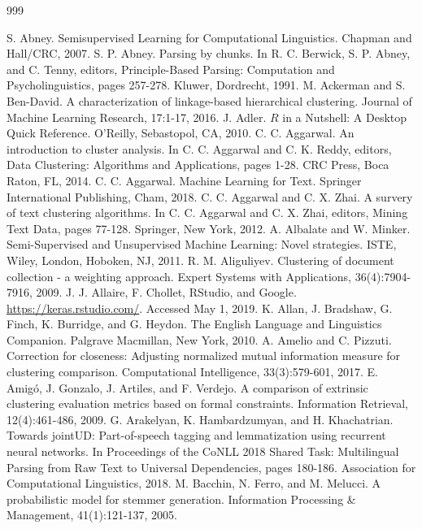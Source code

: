 \documentclass[11pt,openany,executivepaper]{book}
\begin{document}
\backmatter
{}
\begingroup\sloppy
\begin{thebibliography}{999}\RaggedRight

 S. Abney. Semisupervised Learning for Computational Linguistics. Chapman and Hall/CRC, 2007.
 S. P. Abney. Parsing by chunks. In R. C. Berwick, S. P. Abney, and C. Tenny, editors, Principle-Based Parsing: Computation and Psycholinguistics, pages 257-278. Kluwer, Dordrecht, 1991.
 M. Ackerman and S. Ben-David. A characterization of linkage-based hierarchical clustering. Journal of Machine Learning Research, 17:1-17, 2016.
 J. Adler. $R$ in a Nutshell: A Desktop Quick Reference. O'Reilly, Sebastopol, CA, 2010.
 C. C. Aggarwal. An introduction to cluster analysis. In C. C. Aggarwal and C. K. Reddy, editors, Data Clustering: Algorithms and Applications, pages 1-28. CRC Press, Boca Raton, FL, 2014.
 C. C. Aggarwal. Machine Learning for Text. Springer International Publishing, Cham, 2018.
 C. C. Aggarwal and C. X. Zhai. A survery of text clustering algorithms. In C. C. Aggarwal and C. X. Zhai, editors, Mining Text Data, pages 77-128. Springer, New York, 2012.
 A. Albalate and W. Minker. Semi-Supervised and Unsupervised Machine Learning: Novel strategies. ISTE, Wiley, London, Hoboken, NJ, 2011.
 R. M. Aliguliyev. Clustering of document collection - a weighting approach. Expert Systems with Applications, 36(4):7904-7916, 2009.
 J. J. Allaire, F. Chollet, RStudio, and Google. \url{https://keras.rstudio.com/}. Accessed May 1, 2019.
 K. Allan, J. Bradshaw, G. Finch, K. Burridge, and G. Heydon. The English Language and Linguistics Companion. Palgrave Macmillan, New York, 2010.
 A. Amelio and C. Pizzuti. Correction for closeness: Adjusting normalized mutual information measure for clustering comparison. Computational Intelligence, 33(3):579-601, 2017.
 E. Amigó, J. Gonzalo, J. Artiles, and F. Verdejo. A comparison of extrinsic clustering evaluation metrics based on formal constraints. Information Retrieval, 12(4):461-486, 2009.
 G. Arakelyan, K. Hambardzumyan, and H. Khachatrian. Towards jointUD: Part-of-speech tagging and lemmatization using recurrent neural networks. In Proceedings of the CoNLL 2018 Shared Task: Multilingual Parsing from Raw Text to Universal Dependencies, pages 180-186. Association for Computational Linguistics, 2018.
 M. Bacchin, N. Ferro, and M. Melucci. A probabilistic model for stemmer generation. Information Processing \& Management, 41(1):121-137, 2005.

\end{thebibliography}
\end{document}

